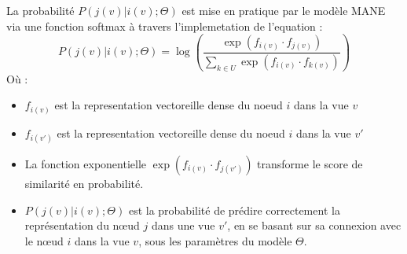 \begin{enumerate}
\begin{enumerate}
                     La probabilité \( P(j(v)|i(v); \Theta) \) est mise en pratique par le modèle MANE via une fonction softmax à travers  l'implemetation de l'equation :
                    \begin{equation}
                      P(j(v) | i(v); \Theta) =  \log \left( \frac{\exp(f_{i(v)} \cdot f_{j(v)})}{\sum_{k \in U} \exp(f_{i(v)} \cdot f_{k(v)})} \right)
                    \end{equation}
                     Où :
                    \begin{itemize}
                        \item \(f_{i(v)} \) est la representation vectoreille dense du noeud \(i\) dans la vue \(v\)
                        \item \(f_{i(v')} \) est la representation vectoreille dense du noeud \(i\) dans la vue \(v'\)
                        \item La fonction exponentielle \( \exp(f_{i(v)} \cdot f_{j(v')}) \) transforme le score de similarité en probabilité.
                         \item \( P(j(v) | i(v); \Theta) \) est la probabilité de prédire correctement la représentation du nœud \( j \) dans une vue \( v' \), en se basant sur sa connexion avec le nœud \( i \) dans la vue \( v \), sous les paramètres du modèle \( \Theta \).
                    \end{itemize}
                      
            \end{enumerate}
                 

\end{enumerate}
